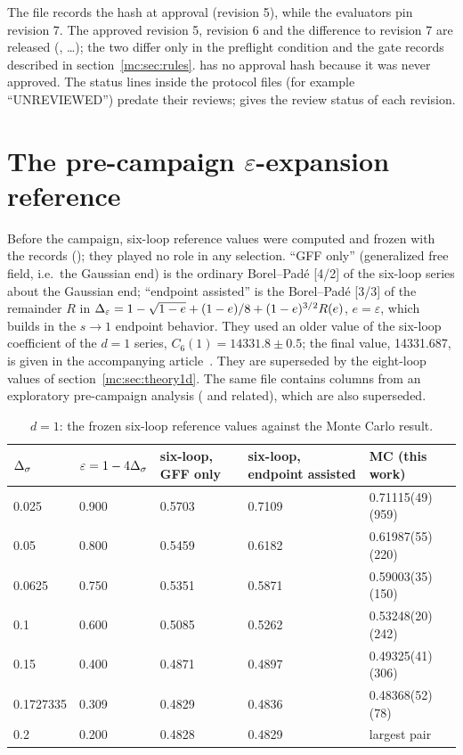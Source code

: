 The file  records the hash at approval (revision 5), while the evaluators pin revision 7. The approved revision 5,
revision 6 and the difference to revision 7 are released (, \dots); the two differ only in
the preflight condition and the gate records described in section~\ref{mc:sec:rules}.  has no approval hash because it
was never approved. The status lines inside the protocol files (for example ``UNREVIEWED'') predate their reviews; 
gives the review status of each revision.

\section{\texorpdfstring{The pre-campaign $\varepsilon$-expansion reference}{The pre-campaign epsilon-expansion reference}}\label{mc:app:eps}
Before the campaign, six-loop reference values were computed and frozen with the records
(); they played no role in any selection. ``GFF only'' (generalized free field, i.e.\ the Gaussian end) is the ordinary
Borel--Pad\'e [4/2] of the six-loop series about the Gaussian end; ``endpoint assisted'' is the Borel--Pad\'e [3/3] of the remainder $R$ in
$\Delta_\varepsilon=1-\sqrt{1-e}+(1-e)/8+(1-e)^{3/2}R(e)$, $e=\varepsilon$, which builds in the $s\to1$ endpoint behavior. They used an older value of the six-loop coefficient of the $d=1$ series, $C_6(1)=14331.8\pm0.5$; the final value, 14331.687, is given in the
accompanying article~\cite{mc:Zheng:2026ai}. They are superseded by the eight-loop values of section~\ref{mc:sec:theory1d}. The same
file contains columns from an exploratory pre-campaign analysis ( and related), which are also superseded.
\begin{table}[htbp]\centering\small
\caption{$d=1$: the frozen six-loop reference values against the Monte Carlo result.}\label{mc:tab:eps}
\begin{tabular}{@{}lllll@{}}\toprule
$\Delta_\sigma$ & $\varepsilon=1-4\Delta_\sigma$ & six-loop, GFF only & six-loop, endpoint assisted & MC (this work) \\\midrule
0.025 & 0.900 & 0.5703 & 0.7109 & 0.71115(49)(959) \\
0.05 & 0.800 & 0.5459 & 0.6182 & 0.61987(55)(220) \\
0.0625 & 0.750 & 0.5351 & 0.5871 & 0.59003(35)(150) \\
0.1 & 0.600 & 0.5085 & 0.5262 & 0.53248(20)(242) \\
0.15 & 0.400 & 0.4871 & 0.4897 & 0.49325(41)(306) \\
0.1727335 & 0.309 & 0.4829 & 0.4836 & 0.48368(52)(78) \\
0.2 & 0.200 & 0.4828 & 0.4829 & largest pair \\
\bottomrule\end{tabular}
\end{table}

